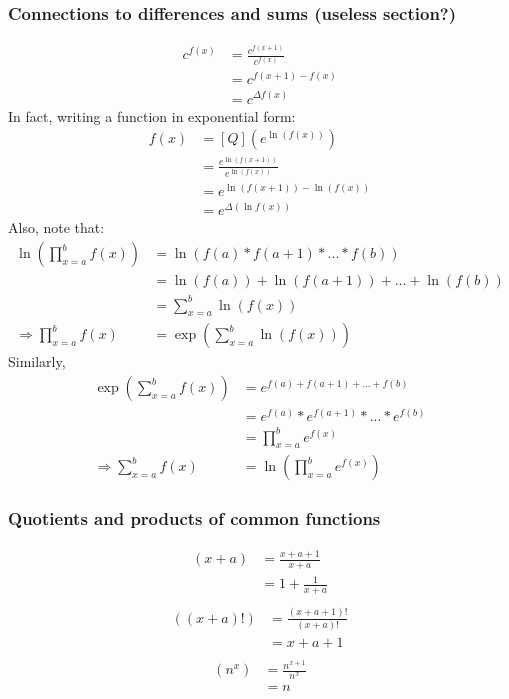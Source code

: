 \documentclass{article}
\renewcommand\({\left(}
\renewcommand\){\right)}
\begin{document}
\subsubsection{Connections to differences and sums (useless section?)}
\begin{align*}
    [Q]c^{f(x)}&=\frac{c^{f(x+1)}}{c^{f(x)}}\\
    &=c^{f(x+1)-f(x)}\\
    &=c^{\Delta f(x)}
\end{align*}
In fact, writing a function in exponential form:
\begin{align*}
    [Q]f(x)&=[Q]\left(e^{\ln\left(f(x)\right)}\right)\\
    &=\frac{e^{\ln\left(f(x+1)\right)}}{e^{\ln\left(f(x)\right)}}\\
    &=e^{\ln\left(f(x+1)\right)-\ln\left(f(x)\right)}\\
    &=e^{\Delta \left(\ln f(x)\right)}
\end{align*}
Also, note that:
\begin{align*}
    \ln\left(\prod_{x=a}^bf(x)\right)&=\ln\left(f(a)*f(a+1)*...*f(b)\right)\\
    &=\ln\left(f(a)\right)+\ln\left(f(a+1)\right)+...+\ln\left(f(b)\right)\\
    &=\sum_{x=a}^b\ln\left(f(x)\right)\\
    \Rightarrow\prod_{x=a}^bf(x)&=\exp\left({\sum_{x=a}^b\ln(f(x))}\right)
\end{align*}
Similarly,
\begin{align*}
    \exp\left(\sum_{x=a}^bf(x)\right)&=e^{f(a)+f(a+1)+...+f(b)}\\
    &=e^{f(a)}*e^{f(a+1)}*...*e^{f(b)}\\
    &=\prod_{x=a}^be^{f(x)}\\
    \Rightarrow\sum_{x=a}^bf(x)&=\ln\left(\prod_{x=a}^be^{f(x)}\right)
\end{align*}
\subsubsection{Quotients and products of common functions}
\begin{align*}
    [Q](x+a)&=\frac{x+a+1}{x+a}\\
    &=1+\frac{1}{x+a}\\
\end{align*}
\begin{align*}
    [Q]\left((x+a)!\right)&=\frac{(x+a+1)!}{(x+a)!}\\
    &=x+a+1\\
\end{align*}
\begin{align*}
    [Q](n^x)&=\frac{n^{x+1}}{n^x}\\
    &=n\\
\end{align*}
\end{document}
